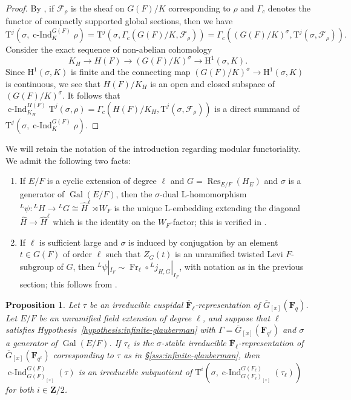 \documentclass[reqno]{amsart}
\numberwithin{equation}{subsection}
\newcommand{\F}{\mathbf{F}}
\newcommand{\Z}{\mathbf{Z}}
\newcommand{\Gal}{\operatorname{Gal}}
\newcommand{\ol}[1]{\overline{#1}}
\newcommand{\wh}[1]{\widehat{#1}}
\newcommand{\co}{\colon}
\newcommand{\ld}{{}^L}
\newcommand\cF{\mathcal{F}}
\DeclareMathOperator{\Res}{Res}
\DeclareMathOperator{\cInd}{c-Ind}
\DeclareMathOperator{\Fr}{Fr}
\newcommand{\rH}{\ensuremath{\mathrm{H}}\xspace}
\newcommand{\rT}{\ensuremath{\mathrm{T}}\xspace}
\newtheorem{prop}[thm]{Proposition}
\theoremstyle{remark}
\numberwithin{equation}{subsection}
\numberwithin{figure}{subsection}
\begin{document}
\begin{proof}
    By \cite[Proposition~3.3]{TV}, if $\cF_\rho$ is the sheaf on $G(F)/K$ corresponding to $\rho$ and $\Gamma_c$ denotes the functor of compactly supported global sections, then we have
    \[
    \rT^j(\sigma,\cInd_K^{G(F)} \rho) = \rT^j(\sigma,\Gamma_c(G(F)/K, \cF_\rho)) = \Gamma_c((G(F)/K)^\sigma, \rT^j(\sigma,\cF_\rho)).
    \]
    Consider the exact sequence of non-abelian cohomology \cite[\S I.5.4-I.5.5]{Se94}
    \[
    K_H \rightarrow H(F) \rightarrow (G(F)/K)^{\sigma} \rightarrow \rH^1(\sigma, K).
    \]
    Since $\rH^1(\sigma, K)$ is finite and the connecting map $(G(F)/K)^\sigma \to \rH^1(\sigma, K)$ is continuous, we see that $H(F)/K_H$ is an open and closed subspace of $(G(F)/K)^\sigma$. It follows that $\cInd_{K_H}^{H(F)} \rT^j(\sigma,\rho) = \Gamma_c(H(F)/K_H, \rT^j(\sigma,\cF_\rho))$ is a direct summand of $\rT^j(\sigma,\cInd_{K}^{G(F)} \rho)$.
\end{proof}

We will retain the notation of the introduction regarding modular functoriality. We admit the following two facts:
\begin{enumerate}
    \item If $E/F$ is a cyclic extension of degree $\ell$ and $G = \Res_{E/F}(H_E)$ and $\sigma$ is a generator of $\Gal(E/F)$, then the $\sigma$-dual L-homomorphism $\ld\psi\co \ld H \to \ld G \cong \wh H^\ell \rtimes W_F$ is the unique L-embedding extending the diagonal $\wh H \to \wh H^\ell$ which is the identity on the $W_F$-factor; this is verified in \cite[\S A.3.2]{CF26b}.
    \item If $\ell$ is sufficient large and $\sigma$ is induced by conjugation by an element $t \in G(F)$ of order $\ell$ such that $Z_G(t)$ is an unramified twisted Levi $F$-subgroup of $G$, then $\ld\psi|_{I_F} \sim \Fr_\ell \circ \ld j_{H,G}|_{I_F}$, with notation as in the previous section; this follows from \cite[Proposition~4.4.1]{CF26b}.
\end{enumerate}

\begin{prop}\label{prop:depth-0-bc-tate-cohom}
    Let $\tau$ be an irreducible cuspidal $\ol\F_\ell$-representation of $\ol G_{[x]}(\F_q)$. Let $E/F$ be an unramified field extension of degree $\ell$, and suppose that $\ell$ satisfies Hypothesis~\ref{hypothesis:infinite-glauberman} with $\Gamma = \ol G_{[x]}(\F_{q^\ell})$ and $\sigma$ a generator of $\Gal(E/F)$. If $\tau_\ell$ is the $\sigma$-stable irreducible $\ol\F_\ell$-representation of $\ol G_{[x]}(\F_{q^\ell})$ corresponding to $\tau$ as in \S\ref{sss:infinite-glauberman}, then $\cInd_{G(F)_{[x]}}^{G(F)}(\tau)$ is an irreducible subquotient of $\rT^i(\sigma, \cInd_{G(F_\ell)_{[x]}}^{G(F_\ell)}(\tau_\ell))$ for both $i \in \Z/2$.
\end{prop}
\end{document}
